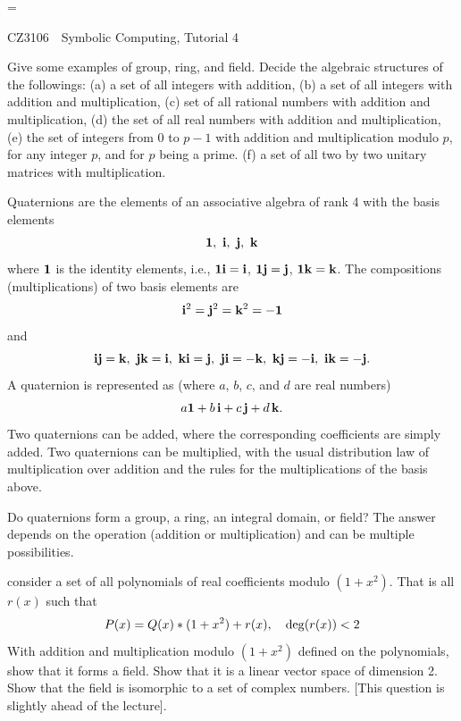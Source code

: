 \magnification=

\nopagenumbers


\centerline{\titlefont CZ3106\ \  Symbolic Computing, Tutorial 4}
\bigskip
\bigskip
{}
\bigskip
\bigskip

\problem  Give some examples of group, ring, and field.  
Decide the algebraic structures of the followings: 
(a) a set of all integers with addition,  (b) a set of all integers with
addition and multiplication, (c) set of all rational numbers with
addition and multiplication, (d) the set of all real numbers 
with addition and multiplication, (e) the set of integers from
0 to $p-1$ with addition and multiplication modulo $p$,  for any
integer $p$, and for $p$ being a prime. (f)  a set of all
two by two  unitary matrices with multiplication. 


\problem  Quaternions are the elements of an associative algebra of rank
4 with the basis elements
$$\bf 1,\ i,\ j,\ k$$
where ${\bf 1}$ is the identity elements, i.e., 
$\bf 1 i = i$, $\bf 1 j = j$, $\bf 1 k = k$.
The compositions (multiplications) of two basis elements are
$$ {\bf i}^2 = {\bf j}^2 = {\bf k}^2 = - {\bf 1}$$ 
and 
$$\bf i j = k,\ jk = i,\ ki = j,\ ji = -k,\ kj = -i,\ ik = - j.$$
A quaternion is represented as (where $a$, $b$, $c$, and $d$ are real numbers)
$$ a {\bf 1} + b\,{\bf i} + c\,{\bf j} + d\,{\bf k}.$$
Two quaternions can be added, where the corresponding coefficients are 
simply added.  Two quaternions can be multiplied, with the usual distribution
law of multiplication over addition and the rules for the multiplications
of the basis above.  
\item{} Do quaternions form a group, a ring, an integral domain, or
field?  The answer depends on the operation (addition or multiplication)
and can be multiple possibilities.

\problem consider a set of all polynomials of real coefficients
modulo $(1+x^2)$.  That is all $r(x)$ such that
$$ P(x) = Q(x)*(1+x^2) + r(x),\quad  {\rm deg}(r(x)) < 2$$
With addition and multiplication modulo $(1+x^2)$ defined on the
polynomials, show that it forms a field.  Show that it is a linear
vector space of dimension 2.  Show that the field is isomorphic to
a set of complex numbers.  [This question is slightly ahead of
the lecture].

\bye
